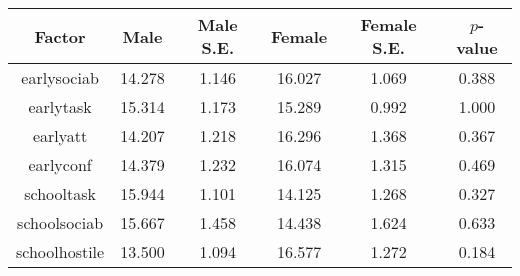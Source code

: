 \begin{longtable}{c c c c c c}
\toprule
\textbf{Factor} & \textbf{Male} & \textbf{Male S.E.}  & \textbf{Female} & \textbf{Female S.E.} & \textbf{$ p $-value} \\
\midrule
earlysociab & 14.278 & 1.146 &  16.027 & 1.069 & 0.388 \\
earlytask & 15.314 & 1.173 &  15.289 & 0.992 & 1.000 \\
earlyatt & 14.207 & 1.218 &  16.296 & 1.368 & 0.367 \\
earlyconf & 14.379 & 1.232 &  16.074 & 1.315 & 0.469 \\
schooltask & 15.944 & 1.101 &  14.125 & 1.268 & 0.327 \\
schoolsociab & 15.667 & 1.458 &  14.438 & 1.624 & 0.633 \\
schoolhostile & 13.500 & 1.094 &  16.577 & 1.272 & 0.184 \\
\bottomrule
\end{longtable}
